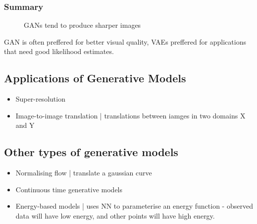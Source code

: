 \documentclass[11pt]{article}
\begin{document}
\subsubsection{Summary}

\begin{figure}[H]
    \centering
    \caption*{GANs tend to produce sharper images}
\end{figure}

GAN is often preffered for better visual quality, VAEs preffered for applications that need good likelihood estimates. 

\subsection{Applications of Generative Models}

\begin{itemize}
    \item Super-resolution
    \item Image-to-image translation | translations between iamges in two domains X and Y
\end{itemize}

\subsection{Other types of generative models}

\begin{itemize}
    \item Normalising flow | translate a gaussian curve
    \item Continuous time generative models
    \item Energy-based models | uses NN to parameterise an energy function - observed data will have low energy, and other points will have high energy.
\end{itemize}
\end{document}
